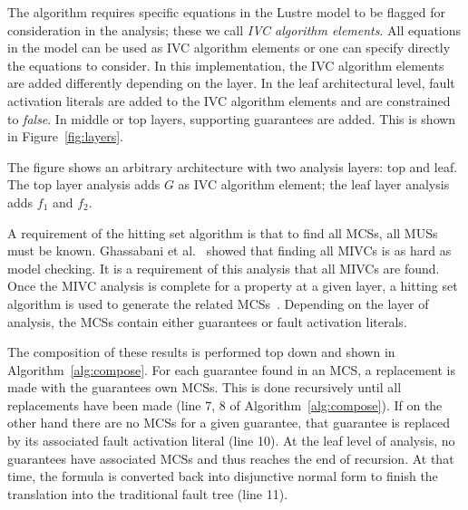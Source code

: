 The \aivcalg algorithm requires  specific equations in the Lustre model to be flagged for consideration in the analysis; these we call \emph{IVC algorithm elements}. All equations in the model can be used as IVC algorithm elements or one can specify directly the equations to consider. In this implementation, the IVC algorithm elements are added differently depending on the layer. In the leaf architectural level, fault activation literals are added to the IVC algorithm elements and are constrained to {\em false}. In middle or top layers, supporting guarantees are added. This is shown in Figure~\ref{fig:layers}. 

The figure shows an arbitrary architecture with two analysis layers: top and leaf. The top layer analysis adds $G$ as IVC algorithm element; the leaf layer analysis adds $f_1$ and $f_2$. 

A requirement of the hitting set algorithm is that to find all MCSs, all MUSs must be known. Ghassabani et al.~\cite{Ghassabani2017EfficientGO} showed that finding all MIVCs is as hard as model checking. It is a requirement of this analysis that all MIVCs are found. Once the MIVC analysis is complete for a property at a given layer, a hitting set algorithm is used to generate the related MCSs~\cite{gainer2017minimal}. Depending on the layer of analysis, the MCSs contain either guarantees or fault activation literals.


The composition of these results is performed top down and shown in Algorithm~\ref{alg:compose}. For each guarantee found in an MCS, a replacement is made with the guarantees own MCSs. This is done recursively until all replacements have been made (line 7, 8 of Algorithm~\ref{alg:compose}). If on the other hand there are no MCSs for a given guarantee, that guarantee is replaced by its associated fault activation literal (line 10). At the leaf level of analysis, no guarantees have associated MCSs and thus reaches the end of recursion. At that time, the formula is converted back into disjunctive normal form to finish the translation into the traditional fault tree (line 11). 

